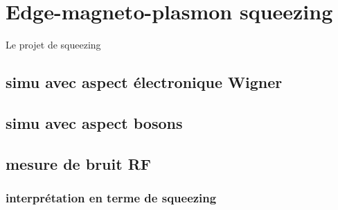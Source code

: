 \chapter{Edge-magneto-plasmon squeezing}

Le projet de squeezing

\section{\texorpdfstring{simu avec aspect électronique Wigner}{}}

\section{\texorpdfstring{simu avec aspect bosons}{}}

\section{\texorpdfstring{mesure de bruit RF}{}}

\subsection{\texorpdfstring{interprétation en terme de squeezing}{}}